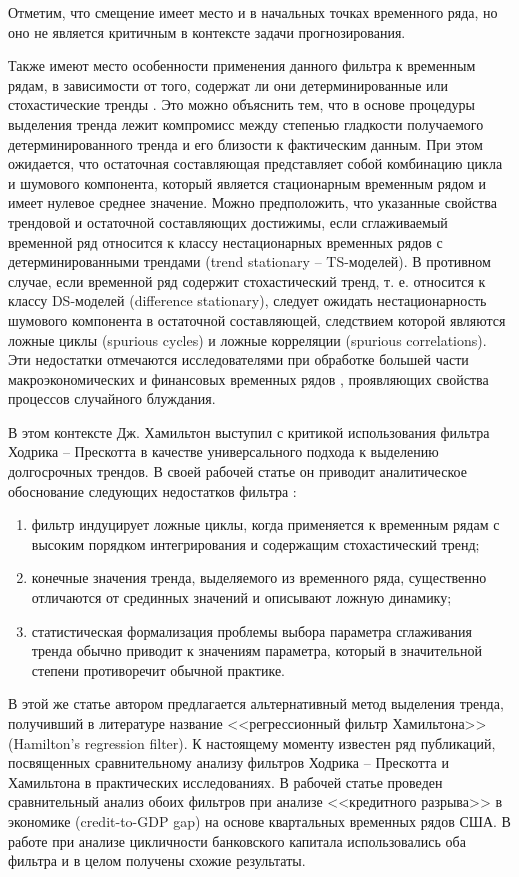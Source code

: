 \documentclass[a4paper,14pt]{extreport}
\begin{document}
	Отметим, что смещение имеет место и в начальных точках временного ряда, но оно не является критичным в контексте задачи прогнозирования.
	
	Также имеют место особенности применения данного фильтра к временным рядам, в зависимости от того, содержат ли они детерминированные или стохастические тренды \cite{kharin8}. Это можно объяснить тем, что в основе процедуры выделения тренда лежит компромисс между степенью гладкости получаемого детерминированного тренда и его близости к фактическим данным. При этом ожидается, что остаточная составляющая представляет собой комбинацию цикла и шумового компонента, который является стационарным временным рядом и имеет нулевое среднее значение. Можно предположить, что указанные свойства трендовой и остаточной составляющих достижимы, если сглаживаемый временной ряд относится к классу нестационарных временных рядов с детерминированными трендами (trend stationary -- TS-моделей).  В противном случае, если временной ряд содержит стохастический тренд, т. е. относится к классу DS-моделей (difference stationary), следует ожидать нестационарность шумового компонента в остаточной составляющей, следствием которой являются ложные циклы (spurious cycles) и ложные корреляции (spurious correlations). Эти недостатки отмечаются исследователями при обработке большей части макроэкономических и финансовых временных рядов \cite{schuler_detrend, harvey_detrend, pederson_hp}, проявляющих свойства процессов случайного блуждания.
	
	В этом контексте Дж. Хамильтон выступил с критикой использования фильтра Ходрика -- Прескотта в качестве универсального подхода к выделению долгосрочных трендов. В своей рабочей статье он приводит аналитическое обоснование следующих недостатков фильтра \cite{hamHP}:
	
	\begin{enumerate}
		\item фильтр индуцирует ложные циклы, когда применяется к временным рядам с высоким порядком интегрирования и содержащим стохастический тренд;
		\item конечные значения тренда, выделяемого из временного ряда, существенно отличаются от срединных значений и описывают ложную динамику;
		\item статистическая формализация проблемы выбора параметра сглаживания тренда обычно приводит к значениям параметра, который в значительной степени противоречит обычной практике.
	\end{enumerate}
	
	В этой же статье автором предлагается альтернативный метод выделения тренда, получивший в литературе название <<регрессионный фильтр Хамильтона>> (Hamilton's regression filter). К настоящему моменту известен ряд публикаций, посвященных сравнительному анализу фильтров Ходрика -- Прескотта и Хамильтона в практических исследованиях. В рабочей статье \cite{schuler_detrend} проведен сравнительный анализ обоих фильтров при анализе <<кредитного разрыва>> в экономике (credit-to-GDP gap) на основе квартальных временных рядов США. В работе \cite{haubrich_cyc_bank} при анализе цикличности банковского капитала использовались оба фильтра и в целом получены схожие результаты.
	
\end{document}

